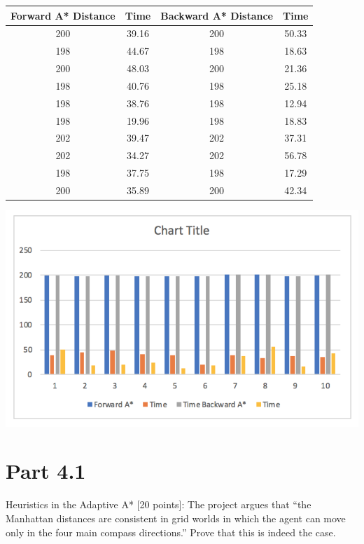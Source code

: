 \documentclass[preprint,12pt,3p]{elsarticle}
\begin{document}
\begin{center}
	\begin{tabular}{||c c c c||} 
		\hline
		Forward A* Distance & Time & Backward A* Distance & Time \\ [0.5ex] 
		\hline\hline
		200 & 39.16 & 200 & 50.33 \\ 
		\hline
		198 & 44.67 & 198 & 18.63 \\
		\hline
		200 & 48.03 & 200 & 21.36 \\
		\hline
		198 &  40.76 & 198 & 25.18 \\
		\hline
		 198 &  38.76 &  198 & 12.94 \\ [1ex] 
		\hline
		\hline
		198 &  19.96 &  198 & 18.83 \\ [1ex] 
		\hline
		\hline
		202 &  39.47 &  202 & 37.31 \\ [1ex] 
		\hline
		\hline
		202 &  34.27 &  202 & 56.78 \\ [1ex] 
		\hline
		\hline
		198 &  37.75 &  198 & 17.29 \\ [1ex] 
		\hline
		\hline
		200 &  35.89 &  200 & 42.34\\ [1ex] 
		\hline
		
		
	\end{tabular}
\end{center}


\graphicspath{ {images/} }

\includegraphics{graph1}

\section{Part 4.1}
\label{sec4}

Heuristics in the Adaptive A* [20 points]: The project argues that “the Manhattan distances are consistent in grid worlds in which the agent can move only in the four main compass directions.” Prove that this is indeed the case.\\ 
\end{document}
